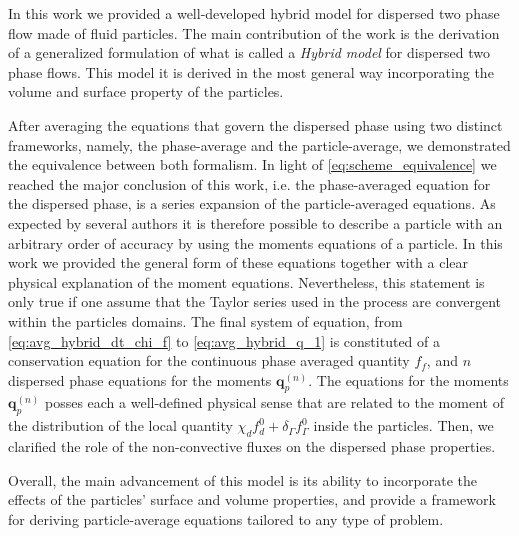In this work we provided a well-developed hybrid model for dispersed two phase flow made of fluid particles.
The main contribution of the work is the derivation of a generalized formulation of what is called a \textit{Hybrid model} for dispersed two phase flows. 
This model it is derived in the most general way incorporating the volume and surface property of the particles.

After averaging the equations that govern the dispersed phase using two distinct frameworks, namely, the phase-average and the particle-average, we demonstrated the equivalence between both formalism. 
In light of \ref{eq:scheme_equivalence} we reached the major conclusion of this work, i.e.  the phase-averaged equation for the dispersed phase, is a series expansion of the particle-averaged equations.  
As expected by several authors \citep{zhang1997momentum,nott2011suspension} it is therefore possible to describe a particle with an arbitrary order of accuracy by using the moments equations of a particle. 
In this work we provided the general form of these equations together with a clear physical explanation of the moment equations. 
Nevertheless, this statement is only true if one assume that the Taylor series used in the process are convergent within the particles domains. 
The final system of equation, from \ref{eq:avg_hybrid_dt_chi_f} to \ref{eq:avg_hybrid_q_1} is constituted of a conservation equation for the continuous phase averaged quantity $f_f$, and $n$ dispersed phase equations for the moments $\textbf{q}_p^{(n)}$. 
The equations for the moments $\textbf{q}_p^{(n)}$ posses each a well-defined physical sense that are related to the moment of the distribution of the local quantity $\chi_df_d^0 + \delta_\Gamma f_\Gamma^0$ inside the particles. 
Then, we clarified the role of the non-convective fluxes on the dispersed phase properties. 

Overall, the main advancement of this model is its ability to incorporate the effects of the particles' surface and volume properties, and provide a framework for deriving particle-average equations tailored to any type of problem.
